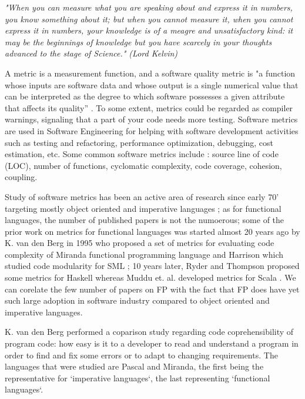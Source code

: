 \documentclass{article}
\begin{document}
\textit{"When you can measure what you are speaking about and express it in numbers, you know something about it; but when you cannot measure it, when you cannot express it in numbers, your knowledge is of a meagre and unsatisfactory kind: it may be the beginnings of knowledge but you have scarcely in your thoughts advanced to the stage of Science." (Lord Kelvin)}\par

A metric is a measurement function, and a software quality metric is "a function whose inputs are software data and whose output is a single numerical value that can be interpreted as the degree to which software possesses a given attribute that affects its quality'' \cite{Kaner04softwareengineering}. To some extent, metrics could be regarded as compiler warnings, signaling that a part of your code needs more testing. Software metrics are used in Software Engineering for helping with software development activities such as testing and refactoring, performance optimization, debugging, cost estimation, etc. Some common software metrics include : source line of code (LOC), number of functions, cyclomatic complexity, code coverage, cohesion, coupling. \par

Study of software metrics has been an active area of research since early 70' targeting mostly object oriented and imperative languages \cite{RyderT05:TFP_2005_Intellect}; as for functional languages, the number of published papers is not the numoerous; some of the prior work on metrics for functional languages was started almost 20 years ago by K. van den Berg in 1995 \cite{DBLP:journals/infsof/BergB95} who proposed a set of metrics for evaluating code complexity of Miranda functional programming language and Harrison which studied code modularity for SML \cite{eps250597}; 10 years later, Ryder and Thompson proposed some metrics for Haskell \cite{RyderT05:TFP_2005_Intellect} whereas  Muddu et. al. developed metrics for Scala \cite{DBLP:conf/icse/MudduABP13}. We can corelate the few number of papers on FP with the fact that FP does have yet such large adoption in software industry compared to object oriented and imperative languages.  \par

K. van den Berg performed a coparison study regarding code coprehensibility of program code: how easy is it to a developer to read and understand a program in order to find and fix some errors or to adapt to changing requirements. The languages that were studied are Pascal and Miranda, the first being the representative for `imperative languages`, the last representing `functional languages`. \par
\end{document}
